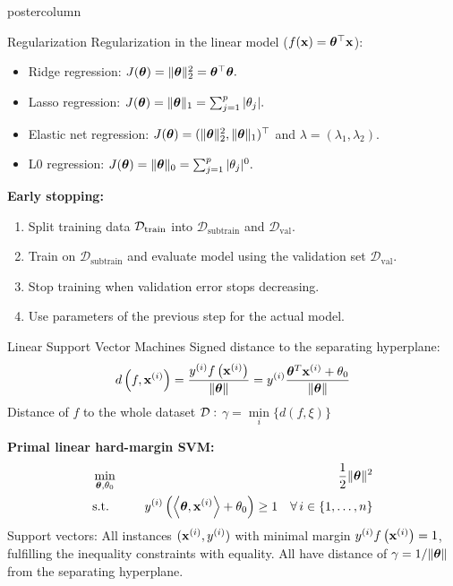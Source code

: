 \documentclass{beamer}
\begin{document}
\begin{frame}[fragile]{}
\begin{columns}
\begin{column}{.31\textwidth}
\begin{beamercolorbox}[center]{postercolumn}
\begin{minipage}{.98\textwidth}
{\begin{myblock}{Regularization}
								Regularization in the linear model ($f(\mathbf{x}) = \bm{\theta}^\top \mathbf{x}$):
								\begin{itemize}
									\setlength{\itemindent}{+.3in}
									\item Ridge regression: $J(\bm{\theta}) =  \|\bm{\theta}\|_2^2 = \bm{\theta}^\top \bm{\theta}.$
									\item Lasso regression: $J(\bm{\theta}) =  \|\bm{\theta}\|_1 = \sum_{j=1}^p |\theta_j|.$
									\item Elastic net regression: $J(\bm{\theta}) =  (\|\bm{\theta}\|_2^2,  \|\bm{\theta}\|_1)^\top$ and $\lambda=(\lambda_1,\lambda_2).$
									\item L0 regression: $J(\bm{\theta}) = \|\bm{\theta}\|_0 = \sum_{j=1}^p |\theta_j|^0.$
								\end{itemize}
								\textbf{Early stopping:}
								\begin{enumerate}
									\setlength{\itemindent}{+.3in}
									\item Split training data $\mathcal{D}_{\text{train}}$ into $\mathcal{D}_{\text{subtrain}}$ and $\mathcal{D}_{\text{val}}.$ 
									\item Train on $\mathcal{D}_{\text{subtrain}}$ and evaluate model using the validation set $\mathcal{D}_{\text{val}}$.
									\item Stop training when validation error stops decreasing.
									\item Use parameters of the previous step for the actual model.
								\end{enumerate}
							\end{myblock} 
							\begin{myblock}{Linear Support Vector Machines}
								Signed distance to the separating hyperplane:
								$$
								d \left(f, \mathbf{x}^{(i)} \right) = \frac{y^{(i)} f\left(\mathbf{x}^{(i)}\right)}{\|\bm{\theta}\|} = y^{(i)} \frac{\bm{\theta}^T \mathbf{x}^{(i)} + \theta_0}{\|\bm{\theta}\|}
								$$ 
								Distance of $f$ to the whole dataset $\mathcal{D}:$ 
								$
								\gamma = \min\limits_i \Big\{ d \left(f, \xi \right) \Big\}
								$
								
								\textbf{Primal linear hard-margin SVM:}
								\begin{eqnarray*}
									& \min\limits_{\bm{\theta}, \theta_0} \quad & \frac{1}{2} \|\bm{\theta}\|^2 \\
									& \text{s.t.} & \,\,y^{(i)}  \left( \left\langle \bm{\theta}, \mathbf{x}^{(i)} \right\rangle + \theta_0 \right) \geq 1 \quad \forall\, i \in \{1, \ldots, n\}
								\end{eqnarray*}
								Support vectors: All instances $(\mathbf{x}^{(i)}, y^{(i)})$ with minimal margin
								$y^{(i)}  f\left(\mathbf{x}^{(i)}\right) = 1$, fulfilling the inequality constraints with equality. 
								All have distance of $\gamma = 1 / \|\bm{\theta}\|$ from the separating hyperplane.
								

\end{myblock}}
\end{minipage}
\end{beamercolorbox}
\end{column}
\end{columns}
\end{frame}
\end{document}
